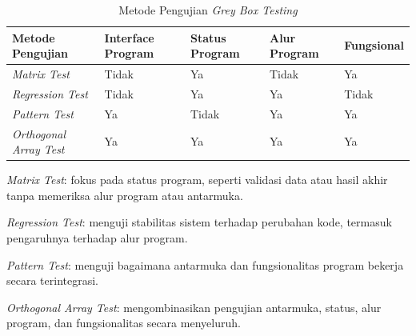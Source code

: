 \begin{table}[h]
	\centering
	\caption{Metode Pengujian \textit{Grey Box Testing}}
	\label{table:2.greybox}
	\begin{tabular}{|>{\centering\arraybackslash}m{}|>{\centering\arraybackslash}m{}|>{\centering\arraybackslash}m{}|>{\centering\arraybackslash}m{}|>{\centering\arraybackslash}m{}|}
		\hline
		\textbf{Metode Pengujian}      & \textbf{Interface Program} & \textbf{Status Program} & \textbf{Alur Program} & \textbf{Fungsional} \\
		\hline
		\textit{Matrix Test}           & Tidak                      & Ya                      & Tidak                 & Ya                  \\
		\hline
		\textit{Regression Test}       & Tidak                      & Ya                      & Ya                    & Tidak               \\
		\hline
		\textit{Pattern Test}          & Ya                         & Tidak                   & Ya                    & Ya                  \\
		\hline
		\textit{Orthogonal Array Test} & Ya                         & Ya                      & Ya                    & Ya                  \\
		\hline
	\end{tabular}
\end{table}

\textit{Matrix Test}: fokus pada status program, seperti validasi data atau hasil akhir tanpa memeriksa alur program atau antarmuka.

\textit{Regression Test}: menguji stabilitas sistem terhadap perubahan kode, termasuk pengaruhnya terhadap alur program.

\textit{Pattern Test}: menguji bagaimana antarmuka dan fungsionalitas program bekerja secara terintegrasi.

\textit{Orthogonal Array Test}: mengombinasikan pengujian antarmuka, status, alur program, dan fungsionalitas secara menyeluruh.
